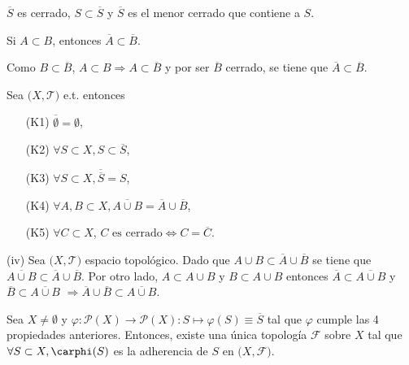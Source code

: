 \begin{obs}
  $\overline{S}$ es cerrado, $S \subset \overline{S}$ y $\overline{S}$ es el menor cerrado que contiene a $S$.
\end{obs}

\begin{lem}
  Si $A \subset B$, entonces $ \overline{A} \subset \overline{B}$.
\end{lem}

\begin{dem}
  Como $B \subset \overline{B}$, $A \subset B \Rightarrow A \subset \overline{B}$ y por ser $\overline{B}$ cerrado, se tiene que $\overline{A} \subset \overline{B}$.
\end{dem}

\begin{prop}
  Sea $\big( X, \mathcal{T} \big)$ e.t. entonces
  \begin{enumerate}[label=(\roman*)]
    \item [(K1)] $\overline{\emptyset} =  \emptyset$,
    \item [(K2)] $\forall S \subset X, S \subset \overline{S}$,
    \item [(K3)] $\forall S \subset X, \overline{\overline{S}} = S$,
    \item [(K4)] $\forall A,B \subset X, \overline{A \cup B} = \overline{A} \cup \overline{B}$,
    \item [(K5)] $\forall C \subset X$, $C \text{ es cerrado} \Leftrightarrow C = \overline{C}$.
  \end{enumerate}
\end{prop}

\begin{dem}(iv)
  Sea $\big( X, \mathcal{T} \big)$ espacio topológico. Dado que $A \cup B \subset \overline{A} \cup \overline{B}$ se tiene que $ \overline{A \cup B} \subset \overline{A} \cup \overline{B}$. Por otro lado, $A \subset A \cup B$ y $B \subset A \cup B$ entonces $\overline{A} \subset \overline{A \cup B}$ y $\overline{B} \subset \overline{A \cup B}$ $\Rightarrow \overline{A} \cup \overline{B} \subset \overline{A \cup B}$.
\end{dem}

\begin{theo}
  Sea $ X \neq \emptyset$ y $ \varphi: \mathcal{P}(X) \to \mathcal{P}(X) : S \mapsto \varphi (S) \equiv \overline{S}$ tal que $\varphi$ cumple las 4 propiedades anteriores. Entonces, existe una única topología $\mathcal{F}$ sobre $X$ tal que $\forall S \subset X, \carphi(S)$ es la adherencia de $S$ en $\big( X, \mathcal{F} \big)$.
\end{theo}

